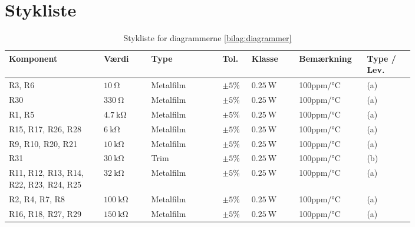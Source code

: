 \chapter{Stykliste} \label{bilag:styklister}

\begin{table}[h!]
\small
\caption{Stykliste for diagrammerne \ref{bilag:diagrammer}}
\label{tab:styklister}
\begin{threeparttable}
\begin{tabular}{p{0.2\linewidth}p{0.1\linewidth}p{0.15\linewidth}p{0.05\linewidth}p{0.1\linewidth}p{0.1\linewidth}p{0.1\linewidth}}
\toprule
\multicolumn{1}{l}{\textbf{Komponent}}       &
\multicolumn{1}{l}{\textbf{Værdi}}       &
\multicolumn{1}{l}{\textbf{Type}}       &
\multicolumn{1}{l}{\textbf{Tol.}} &
\multicolumn{1}{l}{\textbf{Klasse}} &
\multicolumn{1}{l}{\textbf{Bemærkning}} &
\multicolumn{1}{l}{\textbf{Type / Lev.}}  \\ 
\hline
R3, R6 & $\SI{10}{\ohm}$ & Metalfilm & $\pm 5\%$ & $\SI{0.25}{\watt}$ & 100ppm/\si{\celsius} & (a) \\
R30 & $\SI{330}{\ohm}$ & Metalfilm	& $\pm 5\%$ & $\SI{0.25}{\watt}$ & 100ppm/\si{\celsius}  & (a) \\
R1, R5 & $\SI{4.7}{\kilo\ohm}$ & Metalfilm	& $\pm 5\%$ & $\SI{0.25}{\watt}$ & 100ppm/\si{\celsius} & (a) \\
R15, R17, R26, R28 & $\SI{6}{\kilo\ohm}$ & Metalfilm & $\pm 5\%$ & $\SI{0.25}{\watt}$ & 100ppm/\si{\celsius} & (a) \\
R9, R10, R20, R21 & $\SI{10}{\kilo\ohm}$ & Metalfilm & $\pm 5\%$ & $\SI{0.25}{\watt}$ & 100ppm/\si{\celsius} & (a) \\
R31 & $\SI{30}{\kilo\ohm}$ & Trim & $\pm 5\%$ & $\SI{0.25}{\watt}$ & 100ppm/\si{\celsius} & (b) \\
R11, R12, R13, R14, R22, R23, R24, R25 & $\SI{32}{\kilo\ohm}$ & Metalfilm & $\pm 5\%$ & $\SI{0.25}{\watt}$ & 100ppm/\si{\celsius} & (a) \\
R2, R4, R7, R8 & $\SI{100}{\kilo\ohm}$ & Metalfilm & $\pm 5\%$ & $\SI{0.25}{\watt}$ & 100ppm/\si{\celsius} & (a) \\
R16, R18, R27, R29 & $\SI{150}{\kilo\ohm}$ & Metalfilm	& $\pm 5\%$ & $\SI{0.25}{\watt}$ & 100ppm/\si{\celsius} & (a) \\
\midrule

\end{tabular}
\end{threeparttable}
\end{table}
